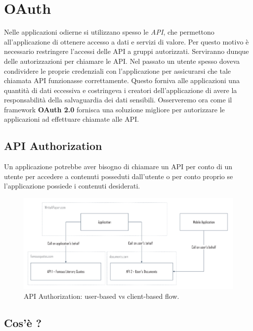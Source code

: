 \chapter{OAuth}

Nelle applicazioni odierne si utilizzano spesso le \textit{API}, che permettono
all'applicazione di ottenere accesso a dati e servizi di valore. Per questo motivo
è necessario restringere l'accessi delle API a gruppi autorizzati. Serviranno dunque
delle autorizzazioni per chiamare le API. Nel passato un utente spesso doveva condividere
le proprie credenziali con l'applicazione per assicurarsi che tale chiamata API
funzionasse correttamente. Questo forniva alle applicazioni una quantità di dati
eccessiva e costringeva i creatori dell'applicazione di avere la responsabilità
della salvaguardia dei dati sensibili. Osserveremo ora come il framework
\textbf{OAuth 2.0} fornisca una soluzione migliore per autorizzare le applicazioni
ad effettuare chiamate alle API.

\section{API Authorization}

Un applicazione potrebbe aver bisogno di chiamare un API per conto di un utente
per accedere a contenuti posseduti dall'utente o per conto proprio se l'applicazione
possiede i contenuti desiderati.

\begin{figure}[H]
      \centering
      \includegraphics[width=\textwidth, keepaspectratio]{capitoli/id_managing/imgs/api1.png}
      \caption{API Authorization: user-based vs client-based flow.}
\end{figure}

\section{Cos'è ?}

